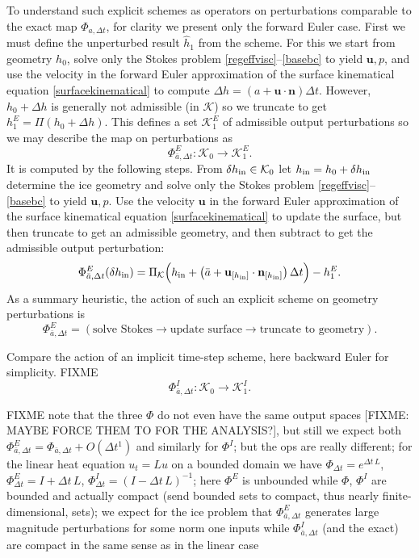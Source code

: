 \documentclass[letterpaper,final,12pt,reqno]{amsart}
\newcommand{\bn}{\mathbf{n}}
\newcommand{\bu}{\mathbf{u}}
\begin{document}
To understand such explicit schemes as operators on perturbations comparable to the exact map $\Phi_{a,\Delta t}$, for clarity we present only the forward Euler case.  First we must define the unperturbed result $\hat h_1$ from the scheme.  For this we start from geometry $h_0$, solve only the Stokes problem \eqref{regeffvisc}--\eqref{basebc} to yield $\bu,p$, and use the velocity in the forward Euler approximation of the surface kinematical equation \eqref{surfacekinematical} to compute $\Delta h = \left(a + \bu\cdot \bn\right) \Delta t$.  However, $h_0+\Delta h$ is generally not admissible (in $\mathcal{K}$) so we truncate to get $h^E_1 = \Pi(h_0+\Delta h)$.  This defines a set $\mathcal{K}^E_1$ of admissible output perturbations so we may describe the map on perturbations as
\begin{equation}
\Phi^E_{\bar a,\Delta t} : \mathcal{K}_0 \to \mathcal{K}^E_1. \label{perturboperatorexplicit}
\end{equation}
It is computed by the following steps.  From $\delta h_{\text{in}}\in \mathcal{K}_0$ let $h_{\text{in}}=h_0+\delta h_{\text{in}}$ determine the ice geometry and solve only the Stokes problem \eqref{regeffvisc}--\eqref{basebc} to yield $\bu,p$.  Use the velocity $\bu$ in the forward Euler approximation of the surface kinematical equation \eqref{surfacekinematical} to update the surface, but then truncate to get an admissible geometry, and then subtract to get the admissible output perturbation:
    $$\Phi^E_{\bar a,\Delta t}(\dhin) = \PiK\Big(\hin + \left(\bar a + \bu_{[\hin]} \cdot \bn_{[\hin]}\right) \Delta t\Big) - h^E_1.$$
As a summary heuristic, the action of such an explicit scheme on geometry perturbations is
    $$\Phi^E_{\bar a,\Delta t} = (\text{solve Stokes} \to \text{update surface} \to \text{truncate to geometry}).$$

Compare the action of an implicit time-step scheme, here backward Euler for simplicity.  FIXME
\begin{equation}
\Phi^I_{\bar a,\Delta t} : \mathcal{K}_0 \to \mathcal{K}^I_1. \label{perturboperatorimplicit}
\end{equation}

FIXME note that the three $\Phi$ do not even have the same output spaces [FIXME: MAYBE FORCE THEM TO FOR THE ANALYSIS?], but still we expect both $\Phi^E_{\bar a,\Delta t} = \Phi_{\bar a,\Delta t} + O(\Delta t^1)$ and similarly for $\Phi^I$; but the ops are really different; for the linear heat equation $u_t=Lu$ on a bounded domain we have $\Phi_{\Delta t} = e^{\Delta t\,L}$, $\Phi^E_{\Delta t} = I + \Delta t\,L$, $\Phi^I_{\Delta t} = (I - \Delta t\,L)^{-1}$; here $\Phi^E$ is unbounded while $\Phi$, $\Phi^I$ are bounded and actually compact (send bounded sets to compact, thus nearly finite-dimensional, sets); we expect for the ice problem that $\Phi^E_{\bar a,\Delta t}$ generates large magnitude perturbations for some norm one inputs while $\Phi^I_{\bar a,\Delta t}$ (and the exact) are compact in the same sense as in the linear case
\end{document}
